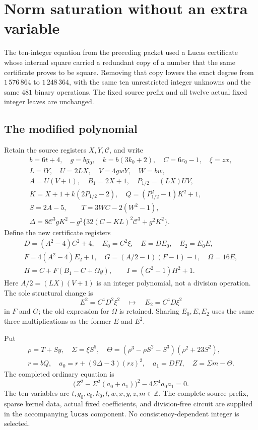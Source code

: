 \section{Norm saturation without an extra variable}

The ten-integer equation from the preceding packet used a Lucas certificate
whose internal square carried a redundant copy of a number that the same
certificate proves to be square. Removing that copy lowers the exact degree
from $1\,576\,864$ to $1\,248\,364$, with the same ten unrestricted
integer unknowns and the same $481$ binary operations. The fixed source
prefix and all twelve actual fixed integer leaves are unchanged.

\subsection{The modified polynomial}

Retain the source registers $X,Y,\mathscr C$, and write
\[
\begin{gathered}
 b=6t+4,\quad g=bg_0,\quad k=b(3k_0+2),\quad C=6c_0-1,\quad \xi=zx,\\
 L=lY,\quad U=2LX,\quad V=4gwY,\quad W=bw,\\
 A=U(V+1),\quad B_1=2X+1,\quad P_{1/2}=(LX)UV,\\
 K=X+1+k(2P_{1/2}-2),\quad Q=(P_{1/2}^2-1)K^2+1,\\
 S=2A-5,\qquad T=3WC-2(W^2-1),\\
 \Delta=8\mathscr C^3gK^2-g^2\{32(C-KL)^2\mathscr C^3+g^2K^2\}.
\end{gathered}
\]
Define the new certificate registers
\[
\begin{gathered}
 D=(A^2-4)C^2+4,\quad E_0=C^2\xi,\quad E=DE_0,\quad E_2=E_0E,\\
 F=4(A^2-4)E_2+1,\quad G=(A/2-1)(F-1)-1,\quad \Omega=16E,\\
 H=C+F(B_1-C+\Omega y),\qquad I=(G^2-1)H^2+1.
\end{gathered}
\]
Here $A/2=(LX)(V+1)$ is an integer polynomial, not a division operation.
The sole structural change is
\[
 E^2=C^4D^2\xi^2\quad\longmapsto\quad E_2=C^4D\xi^2
\]
in $F$ and $G$; the old expression for $\Omega$ is retained.
Sharing $E_0,E,E_2$ uses the same three multiplications as the former
$E$ and $E^2$.

Put
\[
\begin{gathered}
 \rho=T+Sy,\quad \Sigma=\xi S^5,\quad
 \Theta=(\rho^3-\rho S^2-S^3)(\rho^2+23S^2),\\
 r=bQ,\quad a_0=r+(9\Delta-3)(rz)^2,\quad a_1=DFI,
 \quad Z=\Sigma m-\Theta.
\end{gathered}
\]
The completed ordinary equation is
\begin{equation}\label{eq:norm-saturated-ten}
 \boxed{\bigl(Z^2-\Sigma^2(a_0+a_1)\bigr)^2
          -4\Sigma^4a_0a_1=0.}
\end{equation}
The ten variables are $t,g_0,c_0,k_0,l,w,x,y,z,m\in\mathbb Z$.
The complete source prefix, sparse kernel data, actual fixed coefficients,
and division-free circuit are supplied in the accompanying \texttt{lucas}
component. No consistency-dependent integer is selected.

